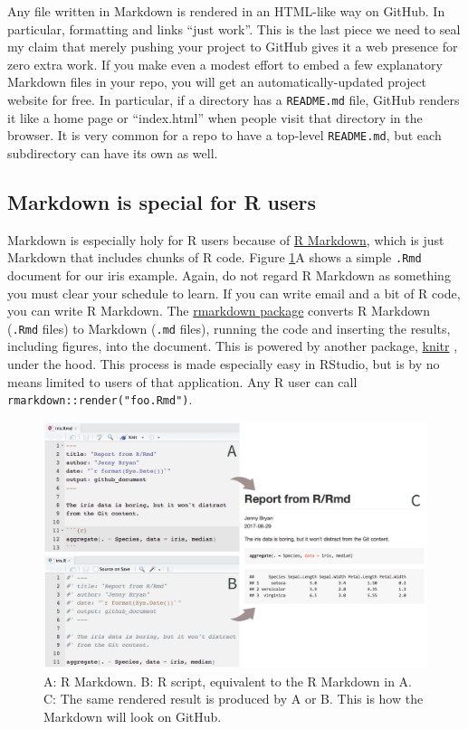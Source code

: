 \documentclass[12pt]{article}
\begin{document}
Any file written in Markdown is rendered in an HTML-like way on GitHub.
In particular, formatting and links ``just work''. This is the last
piece we need to seal my claim that merely pushing your project to
GitHub gives it a web presence for zero extra work. If you make even a
modest effort to embed a few explanatory Markdown files in your repo,
you will get an automatically-updated project website for free. In
particular, if a directory has a \texttt{README.md} file, GitHub renders
it like a home page or ``index.html'' when people visit that directory
in the browser. It is very common for a repo to have a top-level
\texttt{README.md}, but each subdirectory can have its own as well.

\subsection{Markdown is special for R
users}\label{markdown-is-special-for-r-users}

Markdown is especially holy for R users because of
\href{http://rmarkdown.rstudio.com}{R Markdown}, which is just Markdown
that includes chunks of R code. Figure \ref{fig:report-from-r-or-rmd}A
shows a simple \texttt{.Rmd} document for our iris example. Again, do
not regard R Markdown as something you must clear your schedule to
learn. If you can write email and a bit of R code, you can write R
Markdown. The
\href{https://CRAN.R-project.org/package=rmarkdown}{rmarkdown package}
\citep{rmd-pkg} converts R Markdown (\texttt{.Rmd} files) to Markdown
(\texttt{.md} files), running the code and inserting the results,
including figures, into the document. This is powered by another
package, \href{https://CRAN.R-project.org/package=knitr}{knitr}
\citep{knitr-pkg, knitr-book}, under the hood. This process is made
especially easy in RStudio, but is by no means limited to users of that
application. Any R user can call \texttt{rmarkdown::render("foo.Rmd")}.

\begin{figure}
\includegraphics[width=1\linewidth]{report-from-r-or-rmd} \caption{\label{fig:report-from-r-or-rmd}A: R Markdown. B: R script, equivalent to the R Markdown in A. C: The same rendered result is produced by A or B. This is how the Markdown will look on GitHub.}\label{fig:report-from-r-or-rmd}
\end{figure}
\end{document}
